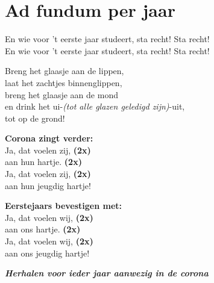 \section{Ad fundum per jaar}
En wie voor 't eerste jaar studeert, sta recht! Sta recht!\\
En wie voor 't eerste jaar studeert, sta recht! Sta recht!

Breng het glaasje aan de lippen,\\
laat het zachtjes binnenglippen,\\
breng het glaasje aan de mond\\
en drink het ui-\textit{(tot alle glazen geledigd zijn)}-uit,\\
tot op de grond!

\textbf{Corona zingt verder:}\\
Ja, dat voelen zij, \textbf{(2x)}\\
aan hun hartje. \textbf{(2x)}\\
Ja, dat voelen zij, \textbf{(2x)}\\
aan hun jeugdig hartje!

\textbf{Eerstejaars bevestigen met:}\\
Ja, dat voelen wij, \textbf{(2x)}\\
aan ons hartje. \textbf{(2x)}\\
Ja, dat voelen wij, \textbf{(2x)}\\
aan ons jeugdig hartje!

\textbf{\textit{Herhalen voor ieder jaar aanwezig in de corona}}